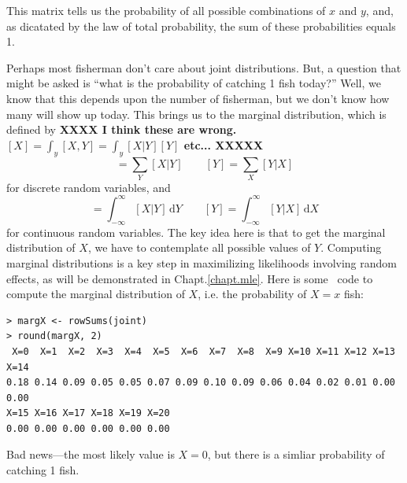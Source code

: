 This matrix tells us the probability of all possible combinations of
$x$ and $y$, and, as dicatated by the law of total probability, the sum
of these probabilities equals 1.

Perhaps most fisherman don't care about joint distributions. But, a
question that might be asked is ``what is the probability
of catching 1 fish today?'' Well, we know that this depends upon the
number of fisherman, but we don't know how many will show up
today. This brings us to the marginal distribution, which is defined by
{\bf XXXX I think these are wrong. $[X] = \int_{y} [X,Y] = \int_{y}
  [X|Y][Y]$ etc... XXXXX}
\begin{equation*}
  [X] = \sum_Y [X|Y] \qquad
  [Y] = \sum_X [Y|X]
\end{equation*}
for discrete random variables, and
\begin{equation*}
  [X] = \int_{-\infty}^\infty [X|Y] \, \mathrm{d}Y \qquad
  [Y] = \int_{-\infty}^\infty [Y|X] \, \mathrm{d}X
\end{equation*}
for continuous random variables. The key idea here is that to get the
marginal distribution of $X$, we have to contemplate all possible
values of $Y$. Computing marginal distributions is a key step in
maximilizing likelihoods involving random effects, as will be
demonstrated in Chapt.\ref{chapt.mle}. Here is some \R~code to compute
the marginal distribution of $X$, i.e. the probability of $X=x$ fish:
\begin{verbatim}
> margX <- rowSums(joint)
> round(margX, 2)
 X=0  X=1  X=2  X=3  X=4  X=5  X=6  X=7  X=8  X=9 X=10 X=11 X=12 X=13 X=14
0.18 0.14 0.09 0.05 0.05 0.07 0.09 0.10 0.09 0.06 0.04 0.02 0.01 0.00 0.00
X=15 X=16 X=17 X=18 X=19 X=20
0.00 0.00 0.00 0.00 0.00 0.00
\end{verbatim}
Bad news---the most likely value is $X=0$, but there is a simliar
probability of catching 1 fish.

